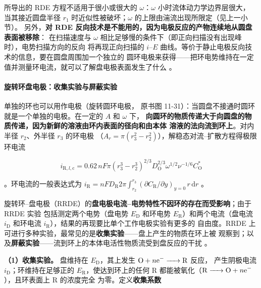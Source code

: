 所导出的 RDE 方程不适用于很小或很大的 $\omega$：$\omega$ 小时流体动力学边界层很大，
当其接近圆盘半径 $r_1$ 时近似性被破坏；$\omega$ 的上限由湍流出现所限定（见上一小节）。
另外，\textbf{对 RDE 反向技术是不能用的，因为电极反应的产物连续地从圆盘表面被移除}：
在扫描速度与 $\omega$ 相比足够慢的条件下（即正向扫描没有出现峰时），电势扫描方向的反向
将再现正向扫描的 $i$–$E$ 曲线。等价于静止电极反向技术的信息，要在圆盘周围加一个独立的
圆环电极来获得——把环电势维持在一定值并测量环电流，就可以了解盘电极表面发生了什么
。

\paragraph{旋转环盘电极：收集实验与屏蔽实验} 单独的环也可以用作电极（旋转圆环电极，
原书图 11-31）：当圆盘不接通时圆环就是一个单独的电极。在一定的 $A$ 和 $\omega$ 下，
\textbf{向圆环的物质传递大于向圆盘的物质传递，因为新鲜的溶液由环内表面的径向和由本体
溶液的法向流到环上}。对内半径 $r_2$、外半径 $r_3$ 的环电极
（$A_r=\pi(r_3^{2}-r_2^{2})$），解稳态对流–扩散方程得极限环电流

\begin{equation}
i_{\mathrm{R},l,\mathrm{c}}
=0.62\,nF\pi\left(r_3^{3}-r_2^{3}\right)^{2/3}
D_{\mathrm{O}}^{2/3}\omega^{1/2}\nu^{-1/6}C_{\mathrm{O}}^{*}
\label{eq:ring-limit}
\end{equation}

。环电流的一般表达式为
$i_{\mathrm{R}}=nFD_{\mathrm{R}}2\pi\int_{r_2}^{r_3}(\partial C_{\mathrm{R}}/\partial y)_{y=0}\,r\,\mathrm{d}r$
。

旋转环–盘电极（RRDE）的\textbf{盘电极电流–电势特性不因环的存在而受影响}；由于 RRDE 实验
包括测定两个电势（盘电势 $E_{\mathrm{D}}$ 和环电势 $E_{\mathrm{R}}$）和两个电流（盘电流
$i_{\mathrm{D}}$ 和环电流 $i_{\mathrm{R}}$），结果的再现要比单个工作电极实验有更多的
自由度。RRDE 上可进行多种实验，最常见的是\textbf{收集实验}——盘上产生的物质在环上被
观察到；以及\textbf{屏蔽实验}——流到环上的本体电活性物质流受到盘反应的干扰
。

\textbf{（1）收集实验。} 盘维持在 $E_{\mathrm{D}}$，其上发生 $\ce{O + $n$e- -> R}$ 反应，
产生阴极电流 $i_{\mathrm{D}}$；环维持在足够正的 $E_{\mathrm{R}}$，使达到环上的任何
$\mathrm{R}$ 都能被氧化（$\ce{R -> O + $n$e-}$），且环表面上 $\mathrm{R}$ 的浓度完全
为零。定义\textbf{收集系数}


